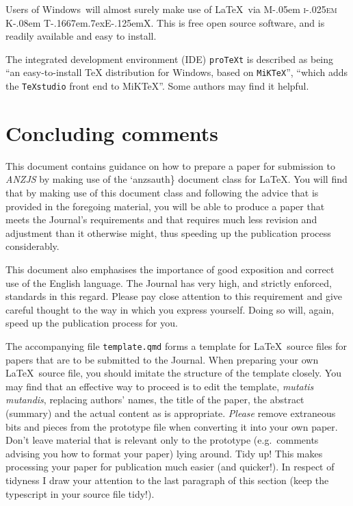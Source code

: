 \documentclass[
doublespace,
  times]{anzsauth}
\newcommand\MiKTeX{{\rmfamily M\kern-.05em \textsc{i\kern-.025em K}\kern-.08em
T\kern-.1667em\lower.7ex\hbox{E}\kern-.125emX}}
\begin{document}
Users of Windows\texttrademark~will almost surely make use of \LaTeX~via
\MiKTeX. This is free open source software, and is readily available and
easy to install.

The integrated development environment (IDE) \texttt{proTeXt} is
described as being ``an easy-to-install \TeX{} distribution for
Windows\texttrademark, based on \texttt{MiKTeX}'', ``which adds the
\texttt{TeXstudio} front end to MiKTeX''. Some authors may find it
helpful.

\section{Concluding comments}\label{sec-concComm}

This document contains guidance on how to prepare a paper for submission
to \emph{ANZJS} by making use of the `anzsauth\} document class for
\LaTeX. You will find that by making use of this document class and
following the advice that is provided in the foregoing material, you
will be able to produce a paper that meets the Journal's requirements
and that requires much less revision and adjustment than it otherwise
might, thus speeding up the publication process considerably.

This document also emphasises the importance of good exposition and
correct use of the English language. The Journal has very high, and
strictly enforced, standards in this regard. Please pay close attention
to this requirement and give careful thought to the way in which you
express yourself. Doing so will, again, speed up the publication process
for you.

The accompanying file \texttt{template.qmd} forms a template for
\LaTeX~source files for papers that are to be submitted to the Journal.
When preparing your own \LaTeX~source file, you should imitate the
structure of the template closely. You may find that an effective way to
proceed is to edit the template, \emph{mutatis mutandis}, replacing
authors' names, the title of the paper, the abstract (summary) and the
actual content as is appropriate. \emph{Please} remove extraneous bits
and pieces from the prototype file when converting it into your own
paper. Don't leave material that is relevant only to the prototype
(e.g.~comments advising you how to format your paper) lying around. Tidy
up! This makes processing your paper for publication much easier (and
quicker!). In respect of tidyness I draw your attention to the last
paragraph of this section (keep the typescript in your source file
tidy!).
\end{document}
